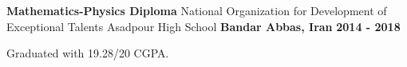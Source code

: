 \begin{cventries}
  \cventry
    {\textbf{Mathematics-Physics Diploma}} %
    {National Organization for Development of Exceptional Talents Asadpour High School} %
    {\textbf{Bandar Abbas, Iran}} %
    {\textbf{2014 - 2018}} %
    {
        \begin{cvitems}
            \item Graduated with 19.28/20 CGPA.
        \end{cvitems}
    }
\end{cventries}
